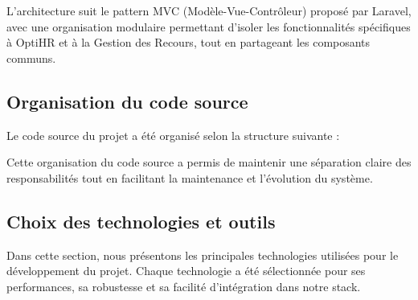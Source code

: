 L'architecture suit le pattern MVC (Modèle-Vue-Contrôleur) proposé par Laravel, avec une organisation modulaire permettant d'isoler les fonctionnalités spécifiques à OptiHR et à la Gestion des Recours, tout en partageant les composants communs.

\subsection{Organisation du code source}
Le code source du projet a été organisé selon la structure suivante :



Cette organisation du code source a permis de maintenir une séparation claire des responsabilités tout en facilitant la maintenance et l'évolution du système.

\subsection{Choix des technologies et outils}
Dans cette section, nous présentons les principales technologies utilisées pour le développement du projet. Chaque technologie a été sélectionnée pour ses performances, sa robustesse et sa facilité d'intégration dans notre stack.

